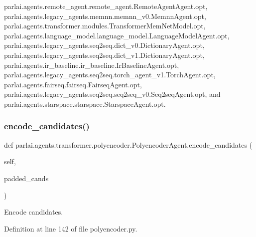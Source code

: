 parlai.\+agents.\+remote\+\_\+agent.\+remote\+\_\+agent.\+Remote\+Agent\+Agent.\+opt, parlai.\+agents.\+legacy\+\_\+agents.\+memnn.\+memnn\+\_\+v0.\+Memnn\+Agent.\+opt, parlai.\+agents.\+transformer.\+modules.\+Transformer\+Mem\+Net\+Model.\+opt, parlai.\+agents.\+language\+\_\+model.\+language\+\_\+model.\+Language\+Model\+Agent.\+opt, parlai.\+agents.\+legacy\+\_\+agents.\+seq2seq.\+dict\+\_\+v0.\+Dictionary\+Agent.\+opt, parlai.\+agents.\+legacy\+\_\+agents.\+seq2seq.\+dict\+\_\+v1.\+Dictionary\+Agent.\+opt, parlai.\+agents.\+ir\+\_\+baseline.\+ir\+\_\+baseline.\+Ir\+Baseline\+Agent.\+opt, parlai.\+agents.\+legacy\+\_\+agents.\+seq2seq.\+torch\+\_\+agent\+\_\+v1.\+Torch\+Agent.\+opt, parlai.\+agents.\+fairseq.\+fairseq.\+Fairseq\+Agent.\+opt, parlai.\+agents.\+legacy\+\_\+agents.\+seq2seq.\+seq2seq\+\_\+v0.\+Seq2seq\+Agent.\+opt, and parlai.\+agents.\+starspace.\+starspace.\+Starspace\+Agent.\+opt.

\mbox{\label{classparlai_1_1agents_1_1transformer_1_1polyencoder_1_1PolyencoderAgent_ae73fe8d98b46a7ef18ef7115f29c999d}} 
\subsubsection{\texorpdfstring{encode\+\_\+candidates()}{encode\_candidates()}}
{\footnotesize\ttfamily def parlai.\+agents.\+transformer.\+polyencoder.\+Polyencoder\+Agent.\+encode\+\_\+candidates (\begin{DoxyParamCaption}\item[{}]{self,  }\item[{}]{padded\+\_\+cands }\end{DoxyParamCaption})}

\begin{DoxyVerb}Encode candidates.\end{DoxyVerb}
 

Definition at line 142 of file polyencoder.\+py.



